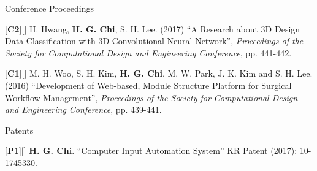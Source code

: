 \begin{cventries}
\cvpub
{Conference Proceedings} %
{ %
\begin{cvitems}
\item {[\textbf{C2}][\href{https://docs.google.com/viewer?url=https://github.com/stnoah1/CV/raw/master/documents/3DM.pdf}{}] H. Hwang, \textbf{H. G. Chi}, S. H. Lee. (2017) “A Research about 3D Design Data Classification with 3D Convolutional Neural Network”, \textit{Proceedings of the Society for Computational Design and Engineering Conference}, pp. 441-442.}
\item {[\textbf{C1}][\href{https://docs.google.com/viewer?url=https://github.com/stnoah1/CV/raw/master/documents/SWORM.pdf}{}] M. H. Woo, S. H. Kim, \textbf{H. G. Chi}, M. W. Park, J. K. Kim and S. H. Lee. (2016) “Development of Web-based, Module Structure Platform for Surgical Workflow Management”, \textit{Proceedings of the Society for Computational Design and Engineering Conference}, pp. 439-441.}
\end{cvitems}
}


\cvpub
{Patents}{
\begin{cvitems}
\item {[\textbf{P1}][\href{https://docs.google.com/viewer?url=https://github.com/stnoah1/CV/raw/master/documents/patent.pdf}{}] \textbf{H. G. Chi}.  “Computer Input Automation System” KR Patent (2017): 10-1745330.}
\end{cvitems}
}



\end{cventries}